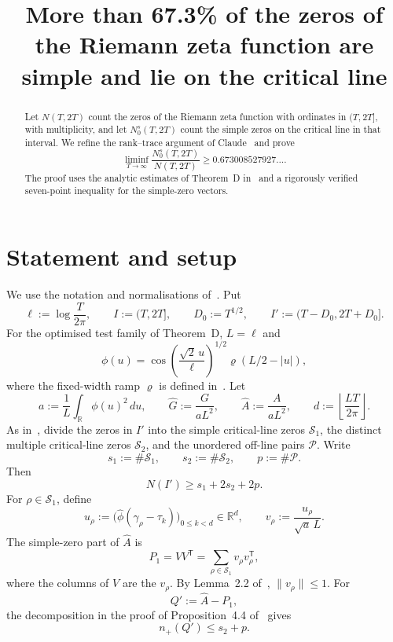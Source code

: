 \documentclass[11pt]{article}
\title{More than 67.3\% of the zeros of the Riemann zeta function are simple and lie on the critical line}
\date{}
\newcommand{\R}{\mathbb R}
\newcommand{\cS}{\mathcal S}
\newcommand{\cP}{\mathcal P}
\begin{document}
\maketitle

\begin{abstract}
Let $N(T,2T)$ count the zeros of the Riemann zeta function with ordinates in
$(T,2T]$, with multiplicity, and let $N_0^s(T,2T)$ count the simple zeros on
the critical line in that interval.  We refine the rank--trace argument of
Claude~\cite{Claude26} and prove
\[
 \liminf_{T\to\infty}\frac{N_0^s(T,2T)}{N(T,2T)}
 \ge 0.673008527927\ldots .
\]
The proof uses the analytic estimates of Theorem~D in~\cite{Claude26} and a
rigorously verified seven-point inequality for the simple-zero vectors.
\end{abstract}

\section{Statement and setup}

We use the notation and normalisations of~\cite[\S\S2,4,7.1]{Claude26}.  Put
\[
 \ell:=\log\frac{T}{2\pi},\qquad I:=(T,2T],\qquad
 D_0:=T^{1/2},\qquad I':=(T-D_0,2T+D_0].
\]
For the optimised test family of Theorem~D, $L=\ell$ and
\[
 \phi(u)=\cos\!\left(\frac{\sqrt2\,u}{\ell}\right)^{1/2}
 \varrho(L/2-|u|),
\]
where the fixed-width ramp $\varrho$ is defined in~\cite[\S2.2]{Claude26}.
Let
\[
 a:=\frac1L\int_{\R}\phi(u)^2\,du,
 \qquad \widehat G:=\frac{G}{aL^2},
 \qquad \widehat A:=\frac{A}{aL^2},
 \qquad d:=\left\lfloor\frac{LT}{2\pi}\right\rfloor.
\]
As in~\cite[\S4.1]{Claude26}, divide the zeros in $I'$ into the simple
critical-line zeros $\cS_1$, the distinct multiple critical-line zeros
$\cS_2$, and the unordered off-line pairs $\cP$.  Write
\[
 s_1:=\#\cS_1,\qquad s_2:=\#\cS_2,\qquad p:=\#\cP.
\]
Then
\begin{equation}\label{eq:Nlower}
 N(I')\ge s_1+2s_2+2p.
\end{equation}
For $\rho\in\cS_1$, define
\[
 u_\rho:=\bigl(\widehat\phi(\gamma_\rho-\tau_k)\bigr)_{0\le k<d}
 \in\R^d,
 \qquad
 v_\rho:=\frac{u_\rho}{\sqrt a\,L}.
\]
The simple-zero part of $\widehat A$ is
\[
 P_1=VV^{\mathsf T}=\sum_{\rho\in\cS_1}v_\rho v_\rho^{\mathsf T},
\]
where the columns of $V$ are the $v_\rho$.  By Lemma~2.2
of~\cite{Claude26}, $\|v_\rho\|\le1$.  For
\[
 Q':=\widehat A-P_1,
\]
the decomposition in the proof of Proposition~4.4 of~\cite{Claude26} gives
\begin{equation}\label{eq:index}
 n_+(Q')\le s_2+p.
\end{equation}
\end{document}
